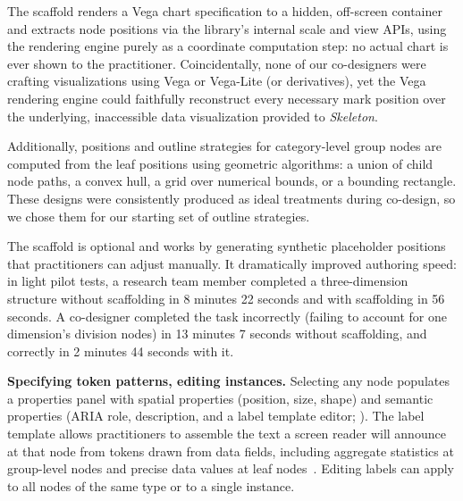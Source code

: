 \documentclass[12pt]{cmuthesis}
\begin{document}
The scaffold renders a Vega chart specification to a hidden, off-screen container and extracts node positions via the library's internal scale and view APIs, using the rendering engine purely as a coordinate computation step: no actual chart is ever shown to the practitioner. Coincidentally, none of our co-designers were crafting visualizations using Vega or Vega-Lite (or derivatives), yet the Vega rendering engine could faithfully reconstruct every necessary mark position over the underlying, inaccessible data visualization provided to \textit{Skeleton}. 

Additionally, positions and outline strategies for category-level group nodes are computed from the leaf positions using geometric algorithms: a union of child node paths, a convex hull, a grid over numerical bounds, or a bounding rectangle. These designs were consistently produced as ideal treatments during co-design, so we chose them for our starting set of outline strategies.

The scaffold is optional and works by generating synthetic placeholder positions that practitioners can adjust manually. It dramatically improved authoring speed: in light pilot tests, a research team member completed a three-dimension structure without scaffolding in 8 minutes 22 seconds and with scaffolding in 56 seconds. A co-designer completed the task incorrectly (failing to account for one dimension's division nodes) in 13 minutes 7 seconds without scaffolding, and correctly in 2 minutes 44 seconds with it.

\textbf{Specifying token patterns, editing instances.} Selecting any node populates a properties panel with spatial properties (position, size, shape) and semantic properties (ARIA role, description, and a label template editor; ). The label template allows practitioners to assemble the text a screen reader will announce at that node from tokens drawn from data fields, including aggregate statistics at group-level nodes and precise data values at leaf nodes~\cite{Jones2024}. Editing labels can apply to all nodes of the same type or to a single instance.
\end{document}
